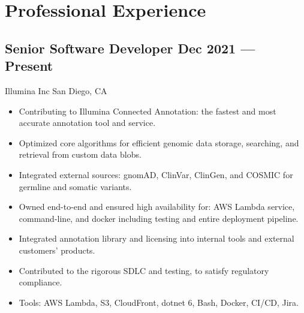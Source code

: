 \documentclass[letter,10pt]{article}
\newcommand{\subtext}[1]{
	#1\par\vspace{-0.2cm}}
\newenvironment{zitemize}{
	\begin{itemize}\itemsep0pt \parskip0pt \parsep1pt}
	{\end{itemize}\vspace{-0.5cm}}
\begin{document}
	
	\section{Professional Experience}
	
	
	\subsection*{Senior Software Developer \hfill Dec 2021 --- Present} 
	\subtext{Illumina Inc \hfill San Diego, CA} 
	\begin{zitemize}
		\item Contributing to Illumina Connected Annotation: the fastest and most accurate annotation tool and service.
		\item Optimized core algorithms for efficient genomic data storage, searching, and retrieval from custom data blobs.
		\item Integrated external sources: gnomAD, ClinVar, ClinGen, and COSMIC for germline and somatic variants.
		\item Owned end-to-end and ensured high availability for: AWS Lambda service, command-line, and  docker including testing and entire deployment pipeline.
		\item Integrated annotation library and licensing into internal tools and external customers' products.
		\item Contributed to the rigorous SDLC and testing, to satisfy regulatory compliance.
		\item Tools: AWS Lambda, S3, CloudFront, dotnet 6, Bash, Docker, CI/CD, Jira.
	\end{zitemize}
	
\end{document}
